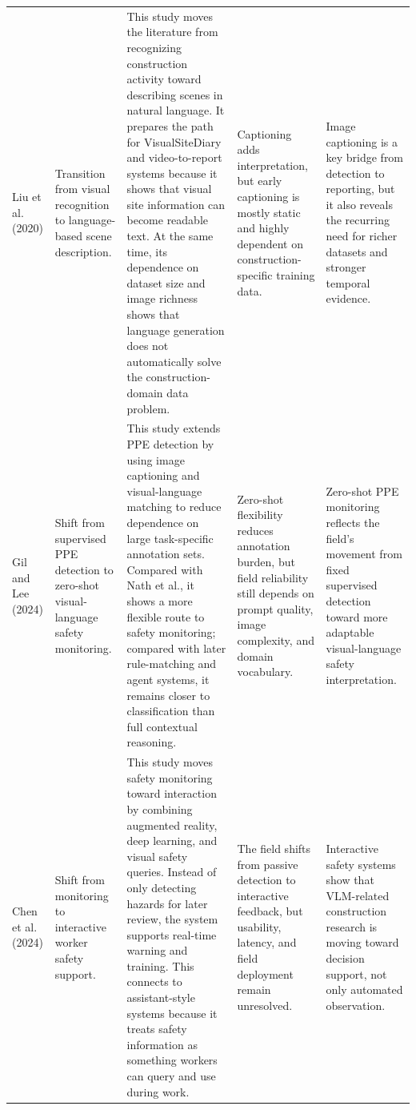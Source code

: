 \documentclass[10pt, letterpaper]{article}
\begin{document}
\begin{landscape}
\begin{longtable}{L{2.7cm} L{3.2cm} L{6.2cm} L{4.9cm} L{5.1cm}}
Liu et al. (2020) & Transition from visual recognition to language-based scene description. & This study moves the literature from recognizing construction activity toward describing scenes in natural language. It prepares the path for VisualSiteDiary and video-to-report systems because it shows that visual site information can become readable text. At the same time, its dependence on dataset size and image richness shows that language generation does not automatically solve the construction-domain data problem. & Captioning adds interpretation, but early captioning is mostly static and highly dependent on construction-specific training data. & Image captioning is a key bridge from detection to reporting, but it also reveals the recurring need for richer datasets and stronger temporal evidence. \\

Gil and Lee (2024) & Shift from supervised PPE detection to zero-shot visual-language safety monitoring. & This study extends PPE detection by using image captioning and visual-language matching to reduce dependence on large task-specific annotation sets. Compared with Nath et al., it shows a more flexible route to safety monitoring; compared with later rule-matching and agent systems, it remains closer to classification than full contextual reasoning. & Zero-shot flexibility reduces annotation burden, but field reliability still depends on prompt quality, image complexity, and domain vocabulary. & Zero-shot PPE monitoring reflects the field's movement from fixed supervised detection toward more adaptable visual-language safety interpretation. \\

Chen et al. (2024) & Shift from monitoring to interactive worker safety support. & This study moves safety monitoring toward interaction by combining augmented reality, deep learning, and visual safety queries. Instead of only detecting hazards for later review, the system supports real-time warning and training. This connects to assistant-style systems because it treats safety information as something workers can query and use during work. & The field shifts from passive detection to interactive feedback, but usability, latency, and field deployment remain unresolved. & Interactive safety systems show that VLM-related construction research is moving toward decision support, not only automated observation. \\


\end{longtable}
\end{landscape}
\end{document}
